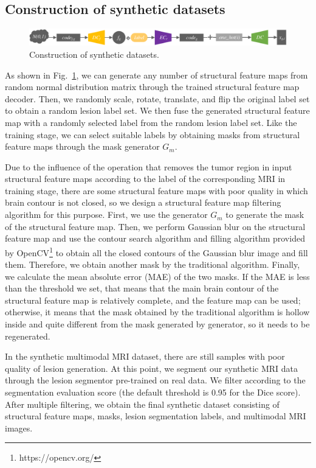 \documentclass[runningheads]{llncs}
\begin{document}
\subsection{Construction of synthetic datasets}
\label{make dataset}
\begin{figure}
	\centering
	\includegraphics[width=1\columnwidth]{figures/make_data}
	\caption{Construction of synthetic datasets.}
	\label{make_data}
\end{figure}
As shown in Fig.~\ref{make_data}, we can generate any number of structural feature maps from random normal distribution matrix through the trained structural feature map decoder. Then, we randomly scale, rotate, translate, and flip the original label set to obtain a random lesion label set. We then fuse the generated structural feature map with a randomly selected label from the random lesion label set. Like the training stage, we can select suitable labels by obtaining masks from structural feature maps through the mask generator $G_m$.

Due to the influence of the operation that removes the tumor region in input structural feature maps according to the label of the corresponding MRI in training stage, there are some structural feature maps with poor quality in which brain contour is not closed, so we design a structural feature map filtering algorithm for this purpose. First, we use the generator $G_m$ to generate the mask of the structural feature map. Then, we perform Gaussian blur\cite{92wink2004denoising} on the structural feature map and use the contour search algorithm and filling algorithm provided by OpenCV\footnote{https://opencv.org/} to obtain all the closed contours of the Gaussian blur image and fill them. Therefore, we obtain another mask by the traditional algorithm. Finally, we calculate the mean absolute error (MAE) of the two masks. If the MAE is less than the threshold we set, that means that the main brain contour of the structural feature map is relatively complete, and the feature map can be used; otherwise, it means that the mask obtained by the traditional algorithm is hollow inside and quite different from the mask generated by generator, so it needs to be regenerated. 

In the synthetic multimodal MRI dataset, there are still samples with poor quality of lesion generation. At this point, we segment our synthetic MRI data through the lesion segmentor pre-trained on real data. We filter according to the segmentation evaluation score (the default threshold is 0.95 for the Dice score). After multiple filtering, we obtain the final synthetic dataset consisting of structural feature maps, masks, lesion segmentation labels, and multimodal MRI images.
\end{document}
